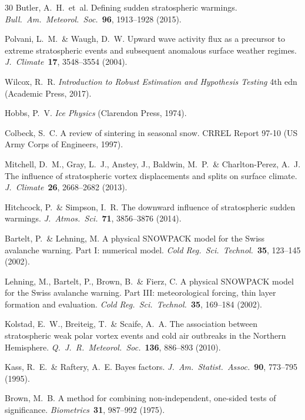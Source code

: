 \documentclass[11pt,letterpaper]{article}
\begin{document}
\begin{thebibliography}{30}
Butler, A.~H.\ et~al. Defining sudden stratospheric warmings. \textit{Bull.\ Am.\ Meteorol.\ Soc.}\ \textbf{96}, 1913--1928 (2015).

Polvani, L.~M.\ \& Waugh, D.~W. Upward wave activity flux as a precursor to extreme stratospheric events and subsequent anomalous surface weather regimes. \textit{J.\ Climate}\ \textbf{17}, 3548--3554 (2004).

Wilcox, R.~R. \textit{Introduction to Robust Estimation and Hypothesis Testing} 4th edn (Academic Press, 2017).

Hobbs, P.~V. \textit{Ice Physics} (Clarendon Press, 1974).

Colbeck, S.~C. A review of sintering in seasonal snow. CRREL Report 97-10 (US Army Corps of Engineers, 1997).

Mitchell, D.~M., Gray, L.~J., Anstey, J., Baldwin, M.~P.\ \& Charlton-Perez, A.~J. The influence of stratospheric vortex displacements and splits on surface climate. \textit{J.\ Climate}\ \textbf{26}, 2668--2682 (2013).

Hitchcock, P.\ \& Simpson, I.~R. The downward influence of stratospheric sudden warmings. \textit{J.\ Atmos.\ Sci.}\ \textbf{71}, 3856--3876 (2014).

Bartelt, P.\ \& Lehning, M. A physical SNOWPACK model for the Swiss avalanche warning. Part I: numerical model. \textit{Cold Reg.\ Sci.\ Technol.}\ \textbf{35}, 123--145 (2002).

Lehning, M., Bartelt, P., Brown, B.\ \& Fierz, C. A physical SNOWPACK model for the Swiss avalanche warning. Part III: meteorological forcing, thin layer formation and evaluation. \textit{Cold Reg.\ Sci.\ Technol.}\ \textbf{35}, 169--184 (2002).

Kolstad, E.~W., Breiteig, T.\ \& Scaife, A.~A. The association between stratospheric weak polar vortex events and cold air outbreaks in the Northern Hemisphere. \textit{Q.\ J.\ R.\ Meteorol.\ Soc.}\ \textbf{136}, 886--893 (2010).

Kass, R.~E.\ \& Raftery, A.~E. Bayes factors. \textit{J.\ Am.\ Statist.\ Assoc.}\ \textbf{90}, 773--795 (1995).

Brown, M.~B. A method for combining non-independent, one-sided tests of significance. \textit{Biometrics}\ \textbf{31}, 987--992 (1975).


\end{thebibliography}
\end{document}
